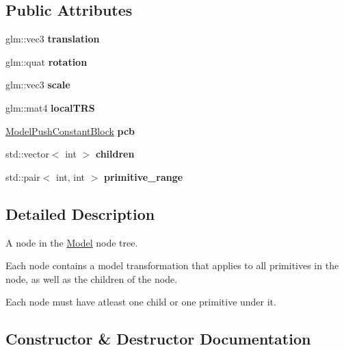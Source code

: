 \subsection*{Public Attributes}
\begin{DoxyCompactItemize}
\item 
\mbox{\label{structblaze_1_1Node_a9f0981eeb9569f9135a7604c7d13fb52}} 
glm\+::vec3 {\bfseries translation}
\item 
\mbox{\label{structblaze_1_1Node_a6fb776faf88ea9ab605acf79975ebc11}} 
glm\+::quat {\bfseries rotation}
\item 
\mbox{\label{structblaze_1_1Node_a59018efc4c257991ad1bcabf6087d078}} 
glm\+::vec3 {\bfseries scale}
\item 
\mbox{\label{structblaze_1_1Node_a96a4d837006cdc49e802a85b77e4fb67}} 
glm\+::mat4 {\bfseries local\+T\+RS}
\item 
\mbox{\label{structblaze_1_1Node_ab4e58da330ba682cec0425fe72c1f8b5}} 
\hyperlink{structblaze_1_1ModelPushConstantBlock}{Model\+Push\+Constant\+Block} {\bfseries pcb}
\item 
\mbox{\label{structblaze_1_1Node_a84ae34bec74601d72c09c45eea4f8133}} 
std\+::vector$<$ int $>$ {\bfseries children}
\item 
\mbox{\label{structblaze_1_1Node_acbdbbfc2dd74227b1154844c200a462a}} 
std\+::pair$<$ int, int $>$ {\bfseries primitive\+\_\+range}
\end{DoxyCompactItemize}


\subsection{Detailed Description}
A node in the \hyperlink{classblaze_1_1Model}{Model} node tree. 

Each node contains a model transformation that applies to all primitives in the node, as well as the children of the node.

Each node must have atleast one child or one primitive under it. 

\subsection{Constructor \& Destructor Documentation}
\mbox{\label{structblaze_1_1Node_a80efd9604109b4b9ddbc72b462e35759}} 
